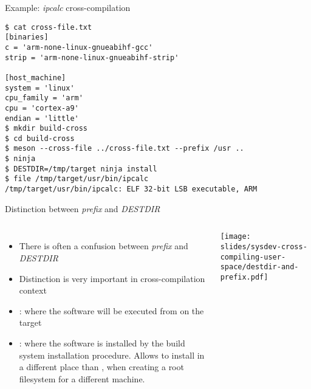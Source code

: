 \begin{frame}[fragile]{Example: {\em ipcalc} cross-compilation}
    \begin{block}{}
      {\footnotesize
\begin{verbatim}
$ cat cross-file.txt
[binaries]
c = 'arm-none-linux-gnueabihf-gcc'
strip = 'arm-none-linux-gnueabihf-strip'

[host_machine]
system = 'linux'
cpu_family = 'arm'
cpu = 'cortex-a9'
endian = 'little'
$ mkdir build-cross
$ cd build-cross
$ meson --cross-file ../cross-file.txt --prefix /usr ..
$ ninja
$ DESTDIR=/tmp/target ninja install
$ file /tmp/target/usr/bin/ipcalc
/tmp/target/usr/bin/ipcalc: ELF 32-bit LSB executable, ARM
\end{verbatim}
      }
    \end{block}
\end{frame}

\begin{frame}{Distinction between {\em prefix} and {\em DESTDIR}}
  \begin{columns}
    \begin{itemize}
    \item There is often a confusion between {\em prefix} and {\em
        DESTDIR}
    \item Distinction is very important in cross-compilation context
    \item {}: where the software will be executed from on the
      target
    \item {}: where the software is installed by the build
      system installation procedure. Allows to install in a different
      place than , when creating a root filesystem for a
      different machine.
    \end{itemize}
    \texttt{[image: slides/sysdev-cross-compiling-user-space/destdir-and-prefix.pdf]}
  \end{columns}
\end{frame}

